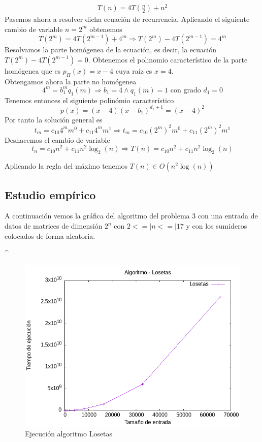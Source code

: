 \documentclass[11pt,openany]{book}
\begin{document}
\begin{gather*}
      T(n)= 4T(\frac{n}{2})+n^2
\end{gather*}
Pasemos ahora a resolver dicha ecuación de recurrencia. Aplicando el siguiente cambio de variable $n=2^m$ obtenemos
\begin{equation*}
      T(2^m)=4T(2^{m-1})+4^m \Rightarrow T(2^m)-4T(2^{m-1})=4^m
\end{equation*}
  Resolvamos la parte homógenea de la ecuación, es decir, la ecuación $T(2^m)-4T(2^{m-1})=0$. Obtenemos el polinomio
  característico de la parte homógenea que es $p_H(x)=x-4$ cuya raíz es $x=4$. \\
  Obtengamos ahora la parte no homógenea
\begin{equation*}
      4^m=b_1^m q_1(m) \Rightarrow b_1=4 \wedge q_1(m)=1 \text{ con grado } d_1=0
\end{equation*}
  Tenemos entonces el siguiente polinómio característico
\begin{equation*}
      p(x)=(x-4)(x-b_1)^{d_1+1}=(x-4)^2
\end{equation*}
  Por tanto la solución general es
\begin{equation*}
      t_m=c_{10}4^mm^0+c_{11}4^mm^1  {\Rightarrow}  t_m=c_{10}(2^{m})^2m^0+c_{11}(2^{m})^2m^1  
\end{equation*}
Deshacemos el cambio de variable
\begin{equation*}
      t_n=c_{10}n^2+c_{11}n^2\log_2(n) \Rightarrow T(n)=c_{10}n^2+c_{11}n^2\log_2(n)
\end{equation*}

  Aplicando la regla del máximo tenemos $T(n) \in O(n^2\log(n))$
\subsection{Estudio empírico}

A continuación  vemos la gráfica del algoritmo del problema 3 con una entrada de datos de matrices de dimensión $2^n$ con $2<=|n<=|17$ y con 
los sumideros colocados de forma aleatoria.
\begin{center}^
      \begin{figure}[H]
            \centering
            \includegraphics[width=0.7\linewidth]{assets/Img/Losetas.png}
            \caption{Ejecución algoritmo Losetas}
            \label{fig:Viajante}
      \end{figure}
\end{center}
\end{document}
